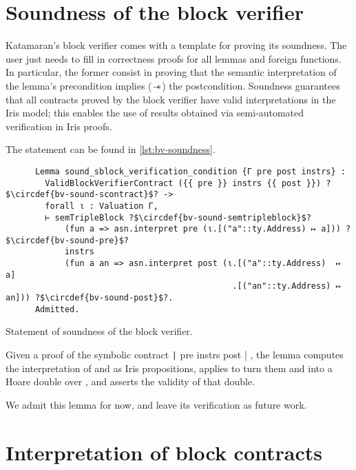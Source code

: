\pagebreak


\section{Soundness of the block verifier}

Katamaran's block verifier comes with a template for proving its soundness. The user just needs to fill in correctness proofs for all lemmas and foreign functions. In particular, the former consist in proving that the semantic interpretation of the lemma's precondition implies (\(\mathrel{-\!\!\ast}\)) the postcondition. Soundness guarantees that all contracts proved by the block verifier have valid interpretations in the Iris model; this enables the use of results obtained via semi-automated verification in Iris proofs.

The statement can be found in %
\cref{lst:bv-soundness}.
\begin{listing}[t]
  \startcstep
  \begin{verbatim}
      Lemma sound_sblock_verification_condition {Γ pre post instrs} :
        ValidBlockVerifierContract ({{ pre }} instrs {{ post }}) ?$\circdef{bv-sound-scontract}$? ->
        forall ι : Valuation Γ,
        ⊢ semTripleBlock ?$\circdef{bv-sound-semtripleblock}$?
            (fun a => asn.interpret pre (ι.[("a"::ty.Address) ↦ a])) ?$\circdef{bv-sound-pre}$?
            instrs
            (fun a an => asn.interpret post (ι.[("a"::ty.Address)  ↦ a]
                                              .[("an"::ty.Address) ↦ an])) ?$\circdef{bv-sound-post}$?.
      Admitted.
  \end{verbatim}
  \caption{Statement of soundness of the block verifier.}
  \label{lst:bv-soundness}
\end{listing}
Given a proof of the symbolic contract \texttt|{{ pre }} instrs {{ post }}| , the lemma computes the interpretation of   and   as Iris propositions, applies   to turn them and  into a Hoare double over , and asserts the validity of that double.

We admit this lemma for now, and leave its verification as future work.

\section{Interpretation of block contracts}

